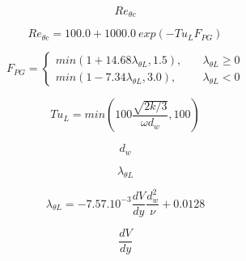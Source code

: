 {\newpage\clearpage
{}%
\begin{displaymath}
Re_{\theta c}
\end{displaymath}%
\lthtmldisplayZ
\lthtmlcheckvsize\clearpage}

{\newpage\clearpage
{}%
\begin{displaymath}
  Re_{\theta c} = 100.0 + 1000.0 ~exp(-Tu_L F_{PG})
\end{displaymath}%
\lthtmldisplayZ
\lthtmlcheckvsize\clearpage}

{\newpage\clearpage
{}%
\begin{displaymath}
  F_{PG} = \left\{
    \begin{array}{ll}
      min(1 + 14.68\lambda_{\theta L}, 1.5) , &\quad\lambda_{\theta L} \geq 0\\
      min(1 - 7.34\lambda_{\theta L}, 3.0) , &\quad\lambda_{\theta L} < 0
    \end{array}\right.
\end{displaymath}%
\lthtmldisplayZ
\lthtmlcheckvsize\clearpage}

{\newpage\clearpage
{}%
\begin{displaymath}
  Tu_L = min\left(100\frac{\sqrt{2k/3}}{\omega d_w}, 100\right)
\end{displaymath}%
\lthtmldisplayZ
\lthtmlcheckvsize\clearpage}

{\newpage\clearpage
{}%
\begin{displaymath}
d_w
\end{displaymath}%
\lthtmldisplayZ
\lthtmlcheckvsize\clearpage}

{\newpage\clearpage
{}%
\begin{displaymath}
\lambda_{\theta L}
\end{displaymath}%
\lthtmldisplayZ
\lthtmlcheckvsize\clearpage}

{\newpage\clearpage
{}%
\begin{displaymath}
  \lambda_{\theta L} = -7.57. 10^{-3}\frac{d V}{dy}\frac{d_w^2}{\nu} + 0.0128
\end{displaymath}%
\lthtmldisplayZ
\lthtmlcheckvsize\clearpage}

{\newpage\clearpage
{}%
\begin{displaymath}
\frac{dV}{dy}
\end{displaymath}%
\lthtmldisplayZ
\lthtmlcheckvsize\clearpage}


